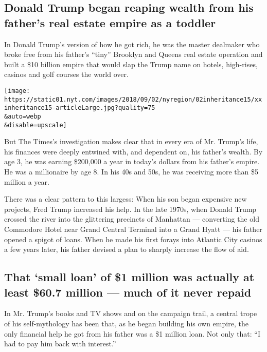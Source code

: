\hypertarget{donald-trump-began-reaping-wealth-from-his-fathers-real-estate-empire-as-a-toddler}{%
\subsection{Donald Trump began reaping wealth from his father's real
estate empire as a
toddler}\label{donald-trump-began-reaping-wealth-from-his-fathers-real-estate-empire-as-a-toddler}}

In Donald Trump's version of how he got rich, he was the master
dealmaker who broke free from his father's ``tiny'' Brooklyn and Queens
real estate operation and built a \$10 billion empire that would slap
the Trump name on hotels, high-rises, casinos and golf courses the world
over.

\texttt{[image: https://static01.nyt.com/images/2018/09/02/nyregion/02inheritance15/xxinheritance15-articleLarge.jpg?quality=75\\\&auto=webp\\\&disable=upscale]}

But The Times's investigation makes clear that in every era of Mr.
Trump's life, his finances were deeply entwined with, and dependent on,
his father's wealth. By age 3, he was earning \$200,000 a year in
today's dollars from his father's empire. He was a millionaire by age 8.
In his 40s and 50s, he was receiving more than \$5 million a year.

There was a clear pattern to this largess: When his son began expensive
new projects, Fred Trump increased his help. In the late 1970s, when
Donald Trump crossed the river into the glittering precincts of
Manhattan --- converting the old Commodore Hotel near Grand Central
Terminal into a Grand Hyatt --- his father opened a spigot of loans.
When he made his first forays into Atlantic City casinos a few years
later, his father devised a plan to sharply increase the flow of aid.

\hypertarget{that-small-loan-of-1-million-was-actually-at-least-607-million--much-of-it-never-repaid}{%
\subsection{That `small loan' of \$1 million was actually at least
\$60.7 million --- much of it never
repaid}\label{that-small-loan-of-1-million-was-actually-at-least-607-million--much-of-it-never-repaid}}

In Mr. Trump's books and TV shows and on the campaign trail, a central
trope of his self-mythology has been that, as he began building his own
empire, the only financial help he got from his father was a \$1 million
loan. Not only that: ``I had to pay him back with interest.''

